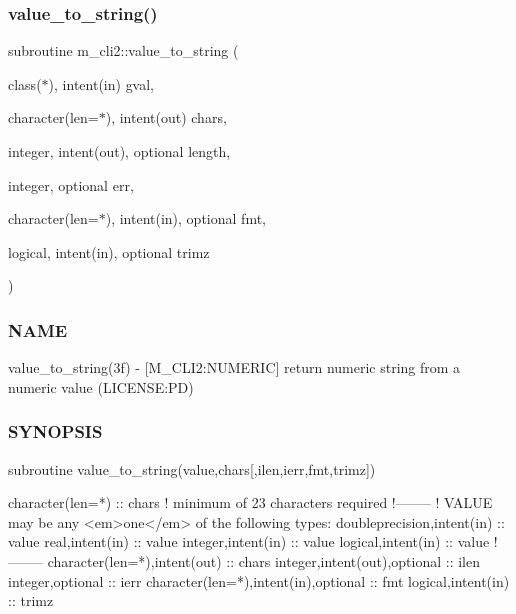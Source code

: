 \subsubsection{\texorpdfstring{value\+\_\+to\+\_\+string()}{value\_to\_string()}}
{\footnotesize\ttfamily subroutine m\+\_\+cli2\+::value\+\_\+to\+\_\+string (\begin{DoxyParamCaption}\item[{class($\ast$), intent(in)}]{gval,  }\item[{character(len=$\ast$), intent(out)}]{chars,  }\item[{integer, intent(out), optional}]{length,  }\item[{integer, optional}]{err,  }\item[{character(len=$\ast$), intent(in), optional}]{fmt,  }\item[{logical, intent(in), optional}]{trimz }\end{DoxyParamCaption})\hspace{0.3cm}{\ttfamily [private]}}



\subsubsection*{N\+A\+ME}

value\+\_\+to\+\_\+string(3f) -\/ \mbox{[}M\+\_\+\+C\+L\+I2\+:N\+U\+M\+E\+R\+IC\mbox{]} return numeric string from a numeric value (L\+I\+C\+E\+N\+SE\+:PD) 

\subsubsection*{S\+Y\+N\+O\+P\+S\+IS}

\begin{DoxyVerb}subroutine value_to_string(value,chars[,ilen,ierr,fmt,trimz])

 character(len=*) :: chars  ! minimum of 23 characters required
 !--------
 ! VALUE may be any <em>one</em> of the following types:
 doubleprecision,intent(in)               :: value
 real,intent(in)                          :: value
 integer,intent(in)                       :: value
 logical,intent(in)                       :: value
 !--------
 character(len=*),intent(out)             :: chars
 integer,intent(out),optional             :: ilen
 integer,optional                         :: ierr
 character(len=*),intent(in),optional     :: fmt
 logical,intent(in)                       :: trimz
\end{DoxyVerb}
